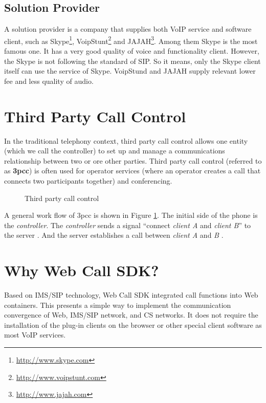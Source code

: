 \subsection{Solution Provider}
\label{sec:BackgroundStudy:VoIPMarket:SolutionProvider}

A solution provider is a company that supplies both VoIP service and software client, such as \textsf{Skype}\texttrademark{}\footnote{\url{http://www.skype.com}}, \textsf{VoipStunt}\footnote{\url{http://www.voipstunt.com}} and JAJAH\footnote{\url{http://www.jajah.com}}.  Among them \textsf{Skype} is the most famous one. It has a very good quality of voice and functionality client. However, the \textsf{Skype} is not following the standard of SIP. So it means, only the \textsf{Skype} client itself can use the service of \textsf{Skype}. \textsf{VoipStund} and \textsf{JAJAH} supply relevant lower fee and less quality of audio.


\section{Third Party Call Control}
\label{sec:BackgroundStudy:ThirdPartyCallControl}

In the traditional telephony context, third party call control allows one entity (which we call the controller) to set up and manage a communications relationship between two or ore other parties.  Third party call control (referred to as \textbf{3pcc}\label{sym:3pcc}) is often used for operator services (where an operator creates a call that connects two participants together) and conferencing.\cite{RFC3725}

\begin{figure}[!hbtp]
\centering
{}
\caption{Third party call control}
\label{fig:ThirdPartyCallControl}
\end{figure}

A general work flow of 3pcc is shown in Figure \ref{fig:ThirdPartyCallControl}. The initial side of the phone is the \textit{controller}. The \textit{controller} sends a signal ``connect \textit{client \nolinebreak A} and \textit{client \nolinebreak B}'' to the server \hyperref[fig:ThirdPartyCallControl]{}. And the server establishes a call between \textit{client A} and \textit{B} \hyperref[fig:ThirdPartyCallControl]{}.


\section{Why Web Call SDK?}
\label{sec:BackgroundStudy:WhyWebCallSDK}

Based on IMS/SIP technology, Web Call SDK integrated call functions into Web containers. This presents a simple way to implement the communication convergence of Web, IMS/SIP network, and CS networks. It does not require the installation of the plug-in clients on the browser or other special client software as most VoIP services.






